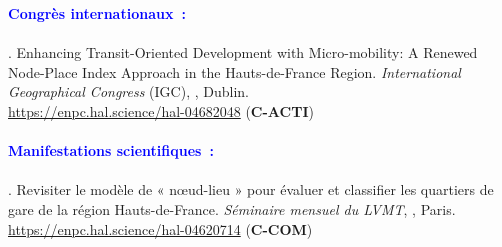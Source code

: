 \begin{refsegment}
     \newpage
     
    \begin{tcolorbox}[colback=white!5!white,
                      colframe=blue!75!blue,
                      title=Valorisation scientifique
                      \\
                      Chapitre~6]
\Large{\textcolor{blue}{\textbf{Congrès internationaux~:}}}
    \\\\
\small{\textcolor{blue}{\textcite{moinse_enhancing_2024}}. Enhancing Transit-Oriented Development with Micro-mobility: A Renewed Node-Place Index Approach in the Hauts-de-France Region. \textsl{International Geographical Congress} (IGC), \textsl{}, Dublin.
\\
\footnotesize{\url{https://enpc.hal.science/hal-04682048}} (\textbf{C-ACTI})}
    \\\\
\Large{\textcolor{blue}{\textbf{Manifestations scientifiques~:}}}
    \\\\
\small{\textcolor{blue}{\textcite{moinse_revisiter_2024}}. Revisiter le modèle de « nœud-lieu » pour évaluer et classifier les quartiers de gare de la région Hauts-de-France. \textsl{Séminaire mensuel du LVMT}, , Paris.
\\
\footnotesize{\url{https://enpc.hal.science/hal-04620714}} (\textbf{C-COM})}
    \end{tcolorbox}

    \newpage
    \begingroup
    \renewcommand{\bibfont}{\scriptsize}
\printbibliography[segment=\therefsegment, heading=subbibintoc, title={Sous-bibliographie du chapitre~6}, label=chap6:bibliographie]
    \endgroup
    \end{refsegment}